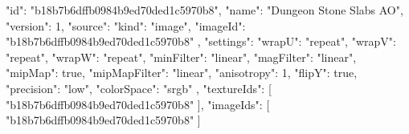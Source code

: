 {
  "id": "b18b7b6dffb0984b9ed70ded1c5970b8",
  "name": "Dungeon Stone Slabs AO",
  "version": 1,
  "source": {
    "kind": "image",
    "imageId": "b18b7b6dffb0984b9ed70ded1c5970b8"
  },
  "settings": {
    "wrapU": "repeat",
    "wrapV": "repeat",
    "wrapW": "repeat",
    "minFilter": "linear",
    "magFilter": "linear",
    "mipMap": true,
    "mipMapFilter": "linear",
    "anisotropy": 1,
    "flipY": true,
    "precision": "low",
    "colorSpace": "srgb"
  },
  "textureIds": [
    "b18b7b6dffb0984b9ed70ded1c5970b8"
  ],
  "imageIds": [
    "b18b7b6dffb0984b9ed70ded1c5970b8"
  ]
}
